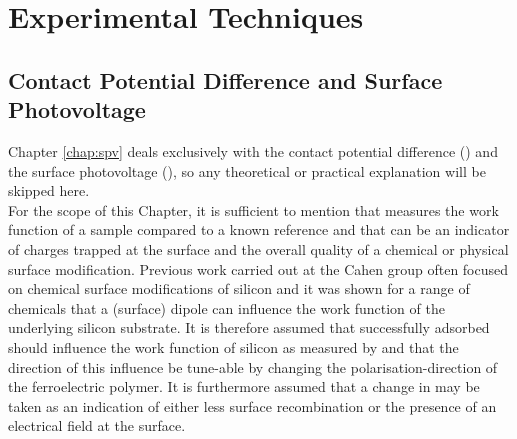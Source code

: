 \section{Experimental Techniques}
\label{sec:exptech}
\subsection{Contact Potential Difference and Surface Photovoltage}
Chapter \ref{chap:spv} deals exclusively with the contact potential difference (\cpd{}) and the surface photovoltage (\spv{}), so any theoretical or practical explanation will be skipped here.\\
For the scope of this Chapter, it is sufficient to mention that \cpd{} measures the work function of a sample compared to a known reference and that \spv{} can be an indicator of charges trapped at the surface and the overall quality of a chemical or physical surface modification. Previous work carried out at the Cahen group often focused on chemical surface modifications of silicon and it was shown for a range of chemicals that a (surface) dipole can influence the work function of the underlying silicon substrate. It is therefore assumed that successfully adsorbed \pvdf{} should influence the work function of silicon as measured by \cpd{} and that the direction of this influence be tune-able by changing the polarisation-direction of the ferroelectric polymer. It is furthermore assumed that a change in \spv{} may be taken as an indication of either less surface recombination or the presence of an electrical field at the surface.

